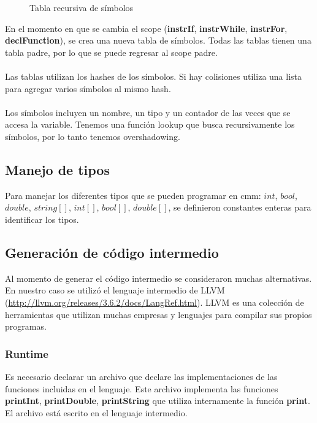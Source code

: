\documentclass[11pt]{article}
\begin{document}
\begin{figure}[H]
    \centering
    \caption{Tabla recursiva de símbolos}
    \label{fig:symtabrec}
\end{figure}

En el momento en que se cambia el scope (\textbf{instrIf}, \textbf{instrWhile}, \textbf{instrFor}, \textbf{declFunction}), se 
crea una nueva tabla de símbolos. Todas las tablas tienen una tabla padre, por lo que se puede regresar al scope padre.
\\\\
Las tablas utilizan los hashes de los símbolos. Si hay colisiones utiliza una lista para agregar varios símbolos al mismo hash.
\\\\
Los símbolos incluyen un nombre, un tipo y un contador de las veces que se accesa la variable. Tenemos una función lookup que 
busca recursivamente los símbolos, por lo tanto tenemos overshadowing.

\subsection{Manejo de tipos}

Para manejar los diferentes tipos que se pueden programar en cmm: $int$, $bool$, $double$, $string[]$, $int[]$, $bool[]$, $double[]$, se definieron constantes enteras para identificar los tipos.

\subsection{Generación de código intermedio}

Al momento de generar el código intermedio se consideraron muchas alternativas. En nuestro caso se utilizó el lenguaje intermedio de LLVM (\url{http://llvm.org/releases/3.6.2/docs/LangRef.html}). LLVM es una colección de herramientas que utilizan muchas empresas y lenguajes para compilar sus propios programas.

\subsubsection{Runtime}

Es necesario declarar un archivo que declare las implementaciones de las funciones incluidas en el lenguaje. Este archivo implementa las funciones \textbf{printInt}, \textbf{printDouble}, \textbf{printString} que utiliza internamente la función \textbf{print}. El archivo está escrito en el lenguaje intermedio.
\end{document}
